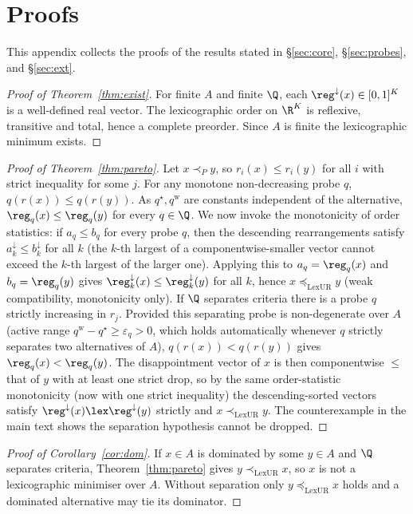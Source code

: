 \section{Proofs}
\label{app:proofs}
This appendix collects the proofs of the results stated in
\S\ref{sec:core}, \S\ref{sec:probes}, and \S\ref{sec:ext}.

\begin{proof}[Proof of Theorem~\ref{thm:exist}]
For finite $A$ and finite $\Q$, each $\reg^{\downarrow}(x)\in[0,1]^K$ is a
well-defined real vector. The lexicographic order on $\R^K$ is reflexive,
transitive and total, hence a complete preorder. Since $A$ is finite the
lexicographic minimum exists.
\end{proof}

\begin{proof}[Proof of Theorem~\ref{thm:pareto}]
Let $x\prec_P y$, so $r_i(x)\le r_i(y)$ for all $i$ with strict inequality for
some $j$. For any monotone non-decreasing probe $q$, $q(r(x))\le q(r(y))$. As
$q^\star,q^{\mathrm w}$ are constants independent of the alternative,
$\reg_q(x)\le\reg_q(y)$ for every $q\in\Q$. We now invoke the monotonicity of
order statistics: if $a_q\le b_q$ for every probe $q$, then the descending
rearrangements satisfy $a^{\downarrow}_k\le b^{\downarrow}_k$ for all $k$ (the
$k$-th largest of a componentwise-smaller vector cannot exceed the $k$-th largest
of the larger one). Applying this to $a_q=\reg_q(x)$ and $b_q=\reg_q(y)$ gives
$\reg^{\downarrow}_k(x)\le\reg^{\downarrow}_k(y)$ for all $k$, hence
$x\preceq_{\mathrm{LexUR}}y$ (weak compatibility, monotonicity only). If $\Q$
separates criteria there is a probe $q$ strictly increasing in $r_j$. Provided
this separating probe is non-degenerate over $A$ (active range $q^{\mathrm
w}-q^\star\ge\varepsilon_q>0$, which holds automatically whenever $q$ strictly
separates two alternatives of $A$), $q(r(x))<q(r(y))$ gives $\reg_q(x)<\reg_q(y)$.
The disappointment vector of $x$ is then componentwise $\le$ that of $y$ with at
least one strict drop, so by the same order-statistic monotonicity (now with one
strict inequality) the descending-sorted vectors satisfy
$\reg^{\downarrow}(x)\lex\reg^{\downarrow}(y)$ strictly and
$x\prec_{\mathrm{LexUR}}y$. The counterexample in the main text shows the
separation hypothesis cannot be dropped.
\end{proof}

\begin{proof}[Proof of Corollary~\ref{cor:dom}]
If $x \in A$ is dominated by some $y \in A$ and $\Q$ separates criteria,
Theorem~\ref{thm:pareto} gives $y\prec_{\mathrm{LexUR}}x$, so $x$ is not a
lexicographic minimiser over $A$. Without separation only $y\preceq_{\mathrm{LexUR}}x$ holds
and a dominated alternative may tie its dominator.
\end{proof}

